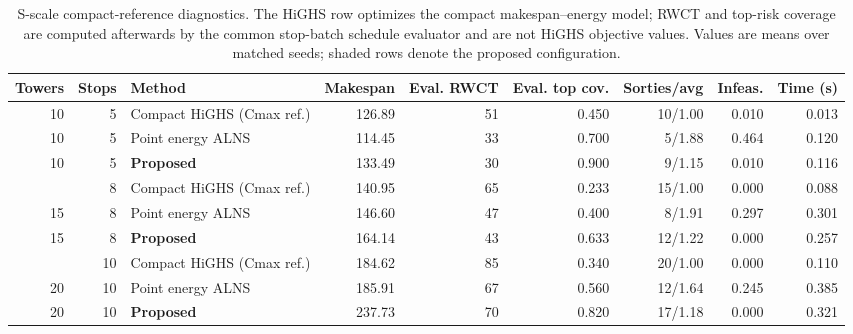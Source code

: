 \begin{table}[H]
\centering
\caption{S-scale compact-reference diagnostics. The HiGHS row optimizes the compact makespan--energy model; RWCT and top-risk coverage are computed afterwards by the common stop-batch schedule evaluator and are not HiGHS objective values. Values are means over matched seeds; shaded rows denote the proposed configuration.}
\label{tab:small-reference}
\small
\setlength{\tabcolsep}{3.0pt}
\begin{tabular*}{\textwidth}{@{\extracolsep{\fill}}rrlrrrrrr@{}}
\toprule
Towers & Stops & Method & Makespan & Eval. RWCT & Eval. top cov. & Sorties/avg & Infeas. & Time (s) \\
\midrule
10 & 5 & Compact HiGHS (Cmax ref.) & 126.89 & 51 & 0.450 & 10/1.00 & 0.010 & 0.013 \\
10 & 5 & Point energy ALNS & 114.45 & 33 & 0.700 & 5/1.88 & 0.464 & 0.120 \\
\rowcolor{gray!10}
10 & 5 & \textbf{Proposed} & 133.49 & 30 & 0.900 & 9/1.15 & 0.010 & 0.116 \\
\addlinespace[2pt]
15 & 8 & Compact HiGHS (Cmax ref.) & 140.95 & 65 & 0.233 & 15/1.00 & 0.000 & 0.088 \\
15 & 8 & Point energy ALNS & 146.60 & 47 & 0.400 & 8/1.91 & 0.297 & 0.301 \\
\rowcolor{gray!10}
15 & 8 & \textbf{Proposed} & 164.14 & 43 & 0.633 & 12/1.22 & 0.000 & 0.257 \\
\addlinespace[2pt]
20 & 10 & Compact HiGHS (Cmax ref.) & 184.62 & 85 & 0.340 & 20/1.00 & 0.000 & 0.110 \\
20 & 10 & Point energy ALNS & 185.91 & 67 & 0.560 & 12/1.64 & 0.245 & 0.385 \\
\rowcolor{gray!10}
20 & 10 & \textbf{Proposed} & 237.73 & 70 & 0.820 & 17/1.18 & 0.000 & 0.321 \\
\bottomrule
\end{tabular*}
\end{table}
